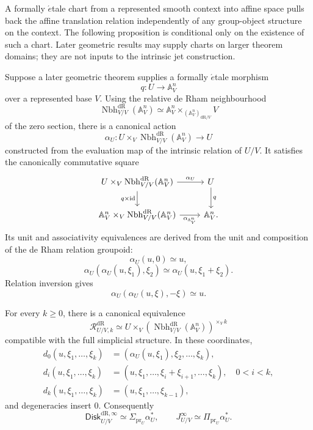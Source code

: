 A formally \(\acute{e}\)tale chart from a represented smooth context into affine
space pulls back the affine translation relation independently of any
group-object structure on the context. The following proposition is conditional only on the existence of
such a chart. Later geometric results may supply charts on larger theorem
domains; they are not inputs to the intrinsic jet construction.
\begin{proposition}
\label{prop:formally-etale-translation-action}
Suppose a later geometric theorem supplies a formally \(\acute{e}\)tale
morphism
\[
  q:U\to\mathbb A^n_V
\]
over a represented base \(V\). Using the relative de Rham neighbourhood
\[
  \operatorname{Nbh}^{\mathrm{dR}}_{V/V}(\mathbb A^n_V)
  \simeq
  \mathbb A^n_V
  \times_{(\mathbb A^n_V)_{\mathrm{dR}/V}}V
\]
of the zero section, there is a canonical action
\[
  \alpha_U:
  U\times_V\operatorname{Nbh}^{\mathrm{dR}}_{V/V}(\mathbb A^n_V)\longrightarrow U
\]
constructed from the evaluation map of the intrinsic relation of \(U/V\).
It satisfies the canonically commutative square
\[
\begin{tikzcd}
U\times_V\operatorname{Nbh}^{\mathrm{dR}}_{V/V}(\mathbb A^n_V)
  \ar[r,"\alpha_U"] \ar[d,"q\times\id"']
  & U \ar[d,"q"]\\
\mathbb A^n_V\times_V\operatorname{Nbh}^{\mathrm{dR}}_{V/V}(\mathbb A^n_V)
  \ar[r,"\alpha_{\mathbb A^n_V}"']
  & \mathbb A^n_V.
\end{tikzcd}
\]  Its unit and associativity equivalences are derived from
the unit and composition of the de Rham relation groupoid:
\[
  \alpha_U(u,0)\simeq u,
\]
\[
  \alpha_U(\alpha_U(u,\xi_1),\xi_2)
  \simeq
  \alpha_U(u,\xi_1+\xi_2).
\]
Relation inversion gives
\[
  \alpha_U(\alpha_U(u,\xi),-\xi)\simeq u.
\]

For every \(k\geq0\), there is a canonical equivalence
\[
  \mathcal R^{\mathrm{dR}}_{U/V,k}
  \simeq
  U\times_V(\operatorname{Nbh}^{\mathrm{dR}}_{V/V}(\mathbb A^n_V))^{\times_V k}
\]
compatible with the full simplicial structure. In these coordinates,
\[
\begin{aligned}
  d_0(u,\xi_1,\ldots,\xi_k)
  &=
  (\alpha_U(u,\xi_1),\xi_2,\ldots,\xi_k),\\
  d_i(u,\xi_1,\ldots,\xi_k)
  &=
  (u,\xi_1,\ldots,\xi_i+\xi_{i+1},\ldots,\xi_k),
  \quad 0<i<k,\\
  d_k(u,\xi_1,\ldots,\xi_k)
  &=
  (u,\xi_1,\ldots,\xi_{k-1}),
\end{aligned}
\]
and degeneracies insert \(0\). Consequently
\[
  \mathsf{Disk}^{\mathrm{dR},\infty}_{U/V}
  \simeq
  \Sigma_{\operatorname{pr}_U}\alpha_U^*,
  \qquad
  J^\infty_{U/V}
  \simeq
  \Pi_{\operatorname{pr}_U}\alpha_U^*.
\]
\end{proposition}

